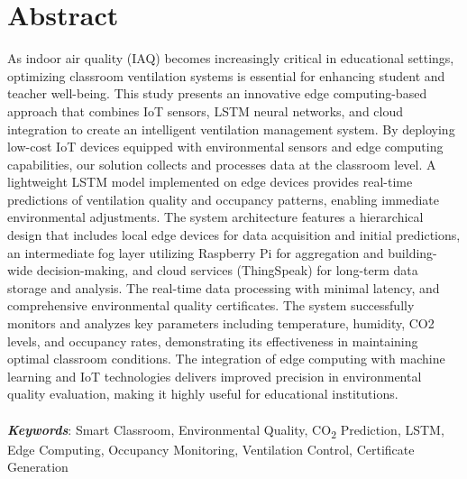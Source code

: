 \clearpage
{}
{}
\chapter*{Abstract}
As indoor air quality (IAQ) becomes increasingly critical in educational settings, optimizing classroom ventilation systems is essential for enhancing student and teacher well-being. This study presents an innovative edge computing-based approach that combines IoT sensors, LSTM neural networks, and cloud integration to create an intelligent ventilation management system. By deploying low-cost IoT devices equipped with environmental sensors and edge computing capabilities, our solution collects and processes data at the classroom level. A lightweight LSTM model implemented on edge devices provides real-time predictions of ventilation quality and occupancy patterns, enabling immediate environmental adjustments. The system architecture features a hierarchical design that includes local edge devices for data acquisition and initial predictions, an intermediate fog layer utilizing Raspberry Pi for aggregation and building-wide decision-making, and cloud services (ThingSpeak) for long-term data storage and analysis. The real-time data processing with minimal latency, and comprehensive environmental quality certificates. The system successfully monitors and analyzes key parameters including temperature, humidity, CO2 levels, and occupancy rates, demonstrating its effectiveness in maintaining optimal classroom conditions. The integration of edge computing with machine learning and IoT technologies delivers improved precision in environmental quality evaluation, making it highly useful for educational institutions.
\\
\\

\textbf{\textit{Keywords}}:
Smart Classroom, Environmental Quality, CO\textsubscript{2}
 Prediction, LSTM, Edge Computing, Occupancy Monitoring, Ventilation Control, Certificate Generation

